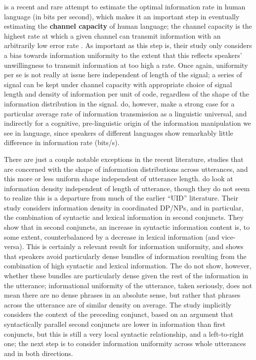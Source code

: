 \documentclass[12pt]{article}
\begin{document}
\citet{coupeetal2019} is a recent and rare attempt to estimate the optimal information rate in human language (in bits per second), which makes it an important step in eventually estimating the \textbf{channel capacity} of human language; the channel capacity is the highest rate at which a given channel can transmit information with an arbitrarily low error rate \citet{shannon1948}. As important as this step is, their study only considers a bias towards information uniformity to the extent that this reflects speakers' unwillingness to transmit information at too high a rate. Once again, uniformity per se is not really at issue here independent of length of the signal; a series of signal can be kept under channel capacity with appropriate choice of signal length and density of information per unit of code, regardless of the shape of the information distribution in the signal. \citet{coupeetal2019} do, however, make a strong case for a particular average rate of information transmission as a linguistic universal, and indirectly for a cognitive, pre-linguistic origin of the information manipulation we see in language, since speakers of different languages show remarkably little difference in information rate (bits/s).


There are just a couple notable exceptions in the recent literature, studies that are concerned with the shape of information distributions across utterances, and this more or less uniform shape independent of utterance length. \citet{temperleygildea2015} do look at information density independent of length of utterance, though they do not seem to realize this is a departure from much of the earlier ``UID'' literature. Their study considers information density in coordinated DP/NPs, and in particular, the combination of syntactic and lexical information in second conjuncts. They show that in second conjuncts, an increase in syntactic information content is, to some extent, counterbalanced by a decrease in lexical information (and vice-versa). This is certainly a relevant result for information uniformity, and shows that speakers avoid particularly dense bundles of information resulting from the combination of high syntactic and lexical information. The do not show, however, whether these bundles are particularly dense given the rest of the information in the utterance; informational uniformity of the utterance, taken seriously, does not mean there are no dense phrases in an absolute sense, but rather that phrases across the utterance are of similar density on average.  The study implicitly considers the context of the preceding conjunct, based on an argument that syntactically parallel second conjuncts are lower in information than first conjuncts, but this is still a very local syntactic relationship, and a left-to-right one; the next step is to consider information uniformity across whole utterances and in both directions. 
\end{document}
